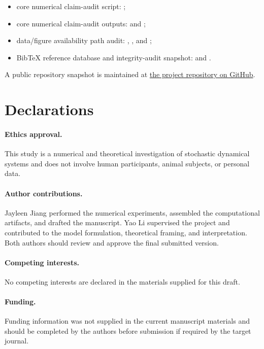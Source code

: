 \documentclass[11pt,a4paper]{article}
\theoremstyle{definition}
\numberwithin{equation}{section}   %
\begin{document}
\begin{itemize}[leftmargin=*]
  \item core numerical claim-audit script:
  ;
  \item core numerical claim-audit outputs:
   and
  ;
  \item data/figure availability path audit:
  ,
  , and
  ;
  \item BibTeX reference database and integrity-audit snapshot:
   and
  .
\end{itemize}
\endgroup
A public repository snapshot is maintained at
\href{https://github.com/jayleenjiang/nls-energy-cascade}{the project
repository on GitHub}.

\section*{Declarations}

\paragraph{Ethics approval.}
This study is a numerical and theoretical investigation of stochastic
dynamical systems and does not involve human participants, animal subjects, or
personal data.

\paragraph{Author contributions.}
Jayleen Jiang performed the numerical experiments, assembled the computational
artifacts, and drafted the manuscript. Yao Li supervised the project and
contributed to the model formulation, theoretical framing, and interpretation.
Both authors should review and approve the final submitted version.

\paragraph{Competing interests.}
No competing interests are declared in the materials supplied for this draft.

\paragraph{Funding.}
Funding information was not supplied in the current manuscript materials and
should be completed by the authors before submission if required by the target
journal.
\end{document}
